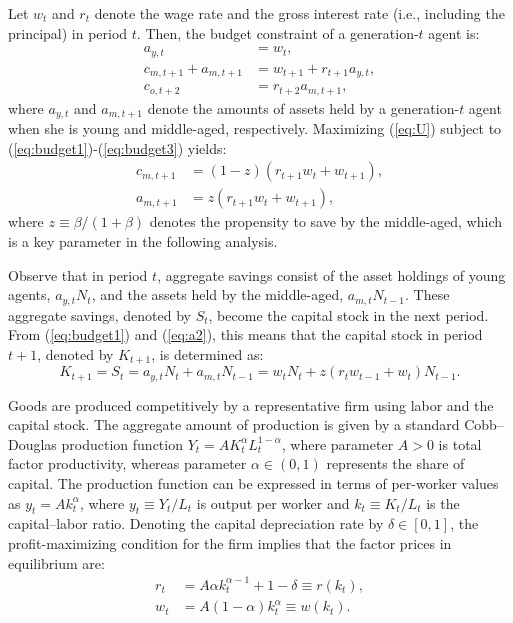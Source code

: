 \documentclass{MBE}%
\begin{document}
{Let $w_{t}$ and $r_{t}$ denote the wage rate and the gross interest rate
(i.e., including the principal) in period $t$. Then, the budget constraint of
a generation-$t$ agent is:%
\begin{align}
a_{y,t}  &  =w_{t},\label{eq:budget1}\\
c_{m,t+1}+a_{m,t+1}  &  =w_{t+1}+r_{t+1}a_{y,t},\label{eq:budget2}\\
c_{o,t+2}  &  =r_{t+2}a_{m,t+1}, \label{eq:budget3}%
\end{align}
where $a_{y,t}$ and $a_{m,t+1}$ denote the amounts of assets held by a
generation-$t$ agent when she is young and middle-aged, respectively.
Maximizing (\ref{eq:U}) subject to (\ref{eq:budget1})-(\ref{eq:budget3})
yields:
\begin{align}
c_{m,t+1}  &  =(1-z) \left(  r_{t+1}w_{t}+w_{t+1}\right)  ,\label{eq:c2}\\
a_{m,t+1}  &  =z \left(  r_{t+1}w_{t}+w_{t+1}\right)  , \label{eq:a2}%
\end{align}
where $z\equiv{\beta}/({1+\beta})$ denotes the propensity to save by the
middle-aged, which is a key parameter in the following analysis.

Observe that in period $t$, aggregate savings consist of the asset holdings of
young agents, $a_{y,t}N_{t}$, and the assets held by the middle-aged,
$a_{m,t}N_{t-1}$. These aggregate savings, denoted by $S_{t}$, become the
capital stock in the next period. From (\ref{eq:budget1}) and (\ref{eq:a2}),
this means that the capital stock in period $t+1$, denoted by $K_{t+1}$, is
determined as:
\begin{equation}
K_{t+1} =S_{t}= a_{y,t}N_{t}+a_{m,t}N_{t-1} =w_{t} N_{t} + z (r_{t}
w_{t-1}+w_{t})N_{t-1}. \label{eq:asset}%
\end{equation}


Goods are produced competitively by a representative firm using labor and the
capital stock. The aggregate amount of production is given by a standard
Cobb--Douglas production function $Y_{t} = AK_{t}^{\alpha}L_{t}^{1-\alpha}$,
where parameter $A>0$ is total factor productivity, whereas parameter
$\alpha\in(0,1)$ represents the share of capital. The production function can
be expressed in terms of per-worker values as $y_{t}= Ak_{t}^{\alpha}$, where
$y_{t}\equiv Y_{t}/L_{t}$ is output per worker and $k_{t}\equiv K_{t}/L_{t}$
is the capital--labor ratio. Denoting the capital depreciation rate by
$\delta\in\left[  0,1\right]  $, the profit-maximizing condition for the firm
implies that the factor prices in equilibrium are:%
\begin{align}
r_{t}  &  =A\alpha k_{t}^{\alpha-1}+1-\delta\equiv r\left(  k_{t}\right)
,\label{eq:r}\\
w_{t}  &  =A\left(  1-\alpha\right)  k_{t}^{\alpha} \equiv w\left(
k_{t}\right)  . \label{eq:w}%
\end{align}


}
\end{document}
